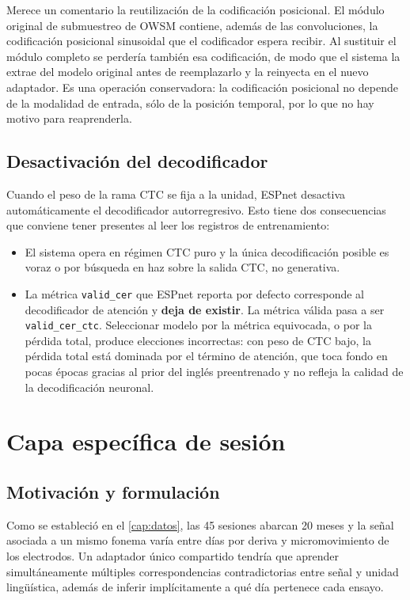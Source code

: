Merece un comentario la reutilización de la codificación posicional. El módulo original de submuestreo de OWSM contiene, además de las convoluciones, la codificación posicional sinusoidal que el codificador espera recibir. Al sustituir el módulo completo se perdería también esa codificación, de modo que el sistema la extrae del modelo original antes de reemplazarlo y la reinyecta en el nuevo adaptador. Es una operación conservadora: la codificación posicional no depende de la modalidad de entrada, sólo de la posición temporal, por lo que no hay motivo para reaprenderla.

\subsection{Desactivación del decodificador}

Cuando el peso de la rama CTC se fija a la unidad, ESPnet desactiva automáticamente el decodificador autorregresivo. Esto tiene dos consecuencias que conviene tener presentes al leer los registros de entrenamiento:

\begin{itemize}
  \item El sistema opera en régimen CTC puro y la única decodificación posible es voraz o por búsqueda en haz sobre la salida CTC, no generativa.
  \item La métrica \texttt{valid\_cer} que ESPnet reporta por defecto corresponde al decodificador de atención y \textbf{deja de existir}. La métrica válida pasa a ser \texttt{valid\_cer\_ctc}. Seleccionar modelo por la métrica equivocada, o por la pérdida total, produce elecciones incorrectas: con peso de CTC bajo, la pérdida total está dominada por el término de atención, que toca fondo en pocas épocas gracias al prior del inglés preentrenado y no refleja la calidad de la decodificación neuronal.
\end{itemize}

\section{Capa específica de sesión}
\label{sec:capa-sesion}

\subsection{Motivación y formulación}

Como se estableció en el \cref{cap:datos}, las 45 sesiones abarcan 20 meses y la señal asociada a un mismo fonema varía entre días por deriva y micromovimiento de los electrodos. Un adaptador único compartido tendría que aprender simultáneamente múltiples correspondencias contradictorias entre señal y unidad lingüística, además de inferir implícitamente a qué día pertenece cada ensayo.


